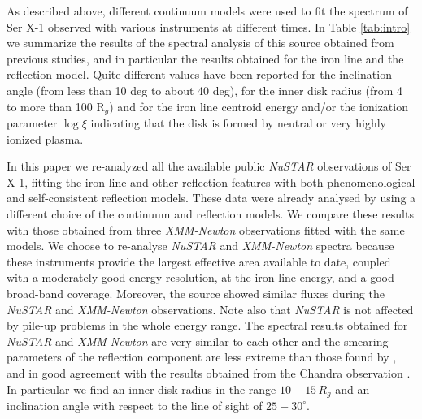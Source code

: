 \documentclass{aa}
\begin{document}

As described above, different continuum models were used to fit the 
spectrum of Ser X-1 observed with various instruments at different times. 
In Table \ref{tab:intro} we summarize the results of the spectral 
analysis of this source obtained from previous studies, and in particular
the results obtained for the iron line and the reflection model. 
Quite different values have been reported for the inclination angle (from less
than 10 deg to about 40 deg), for the inner disk radius (from 4 to more 
than 100 R$_g$)
and for the iron line centroid energy and/or the ionization parameter 
$\log \xi$ indicating that the disk is formed by neutral or very highly 
ionized plasma.

In this paper we re-analyzed all the available public \emph{NuSTAR} 
observations of Ser X-1, fitting the iron line and other reflection features 
with both phenomenological and self-consistent reflection models. 
These data were already analysed by \citet{Miller.etal:13} using 
a different choice of the continuum and reflection models.
We compare these results with those obtained from three \emph{XMM-Newton} 
observations \citep[already analyzed by][]{Bhatta.etal:07} fitted with the 
same models. 
We choose to re-analyse \emph{NuSTAR} and \emph{XMM-Newton}
spectra because these instruments provide the largest effective area
available to date, coupled with a moderately good energy resolution, at 
the iron line energy, and a good broad-band coverage. Moreover, the source
showed similar fluxes during the \emph{NuSTAR} and \emph{XMM-Newton} observations.
Note also that \emph{NuSTAR} is not affected by pile-up problems in the whole
energy range. 
The spectral results obtained for \emph{NuSTAR} and \emph{XMM-Newton}
are very similar to each other and the smearing parameters of the 
reflection component are less extreme than those found by \citet{Miller.etal:13},
and in good agreement with the results obtained from the Chandra observation 
\citep{Chiang.etal:16}.
In particular we find an inner disk radius in the range $10-15\, R_g$ and
an inclination angle with respect to the line of sight of $25-30^\circ$.
\end{document}
